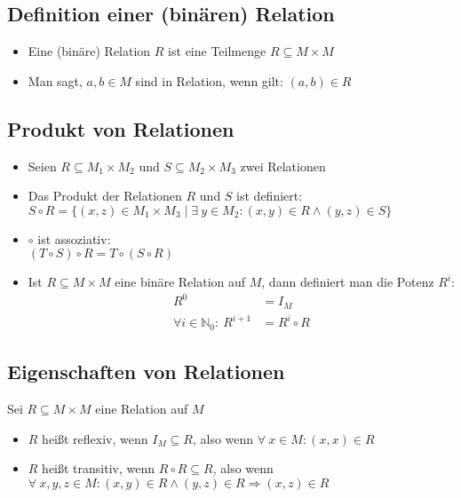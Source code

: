 \documentclass{article}
\newcommand{\Nz}{{\mathbb{N}_0}} %
\newcommand{\important}[1]{\textcolor{importantColor}{#1}}
\newcommand{\set}[1]{\{#1\}}
\begin{document}
\subsection{Definition einer (binären) Relation}
\begin{itemize}
    \item Eine (binäre) Relation $R$ ist eine Teilmenge $R \subseteq M \times M$
    \item Man sagt, $a,b \in M$ sind in Relation, wenn gilt: $(a,b)\in R$
\end{itemize}
\subsection{Produkt von Relationen}
\begin{itemize}
    \item Seien $R\subseteq M_1\times M_2$ und $S\subseteq M_2 \times M_3$ zwei Relationen
    \item Das \important{Produkt der Relationen} $R$ und $S$ ist definiert:\\
    $S\circ R=\set{(x,z)\in M_1 \times M_3 \mid \exists\: y\in M_2: (x,y)\in R \land (y,z)\in S}$
    \item $\circ$ ist assoziativ:\\
    $(T\circ S)\circ R = T\circ(S\circ R)$
    \item Ist $R\subseteq M\times M$ eine binäre Relation auf $M$, dann definiert man die \important{Potenz $R^i$}:
    \begin{align*}
    R^0 &= I_M\\
    \forall i \in \Nz:\:R^{i+1} &= R^i\circ R
    \end{align*}
\end{itemize}
\subsection{Eigenschaften von Relationen}
Sei $R\subseteq M\times M$ eine Relation auf $M$
\begin{itemize}
    \item $R$ heißt \important{reflexiv}, wenn $I_M\subseteq R$, also wenn $\forall\: x \in M: (x,x)\in R$
    \item $R$ heißt \important{transitiv}, wenn $R \circ R\subseteq R$, also wenn \\$\forall\: x,y,z \in M: (x,y)\in R \land (y,z) \in R \Rightarrow (x,z) \in R$
\end{itemize}
\end{document}
